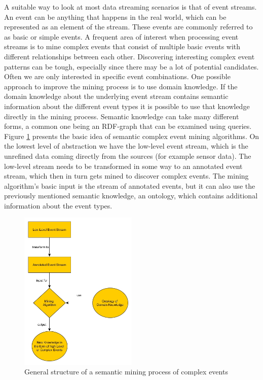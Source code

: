 A suitable way to look at most data streaming scenarios is that of event streams. An event can be anything that happens in the real world, which can be represented as an element of the stream. These events are commonly referred to as basic or simple events. A frequent area of interest when processing event streams is to mine complex events that consist of multiple basic events with different relationships between each other. Discovering interesting complex event patterns can be tough, especially since there may be a lot of potential candidates. Often we are only interested in specific event combinations. One possible approach to improve the mining process is to use domain knowledge. If the domain knowledge about the underlying event stream contains semantic information about the different event types it is possible to use that knowledge directly in the mining process. Semantic knowledge can take many different forms, a common one being an RDF-graph that can be examined using queries. \newline
Figure \ref{fig_basicProblemStructure} presents the basic idea of semantic complex event mining algorithms. On the lowest level of abstraction we have the low-level event stream, which is the unrefined data coming directly from the sources (for example sensor data). The low-level stream needs to be transformed in some way to an annotated event stream, which then in turn gets mined to discover complex events. The mining algorithm's basic input is the stream of annotated events, but it can also use the previously mentioned semantic knowledge, an ontology, which contains additional information about the event types.
\begin{figure}[h]
	\centering
  	\includegraphics[width=0.5\textwidth]{basicProblemStructure.jpg}
	\caption{General structure of a semantic mining process of complex events}
	\label{fig_basicProblemStructure}
\end{figure}

